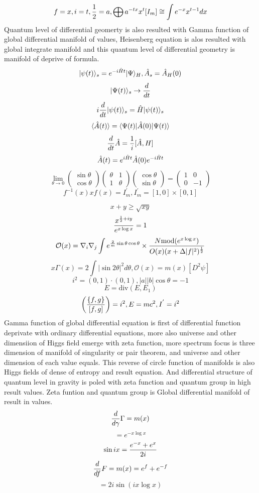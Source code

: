 \documentclass{jsarticle}
\begin{document}
    $$ f = x, i = t, {1 \over 2} = a, \bigoplus a^{-t x}x^t [I_m]
     \cong \int e^{-x} x^{t - 1}dx $$
     Quantum level of differential geomerty is also resulted with
    Gamma function of global differential manifold of values, Heisenberg
    equation is alos resulted with global integrate manifold and this
    quantum level of differential geometry is manifold of deprive of formula.
    $$ |\psi(t)\rangle_s = e^{-i\Hat{H} t}|\Psi\rangle_{H},
    \Hat{A}_s = \Hat{A}_H(0) $$
    $$ |\Psi(t)\rangle_s \to {d \over dt} $$
    $$ i {d \over dt}|\psi (t) \rangle_s = \Hat{H}|\psi(t)\rangle_s $$
    $$ \langle\Hat{A}(t)\rangle = \langle\Psi(t)|\Hat{A}(0)|\Psi(t)\rangle  $$
    $$ {d \over dt}\Hat{A} = {1 \over i}[\Hat{A},H] $$
    $$ \Hat{A}(t) = e^{i\Hat{H}t}\Hat{A}(0)e^{-i\Hat{H}t} $$
    $$ \lim_{\theta \to 0} \begin{pmatrix} \sin \theta \\
    \cos \theta \end{pmatrix} \begin{pmatrix} \theta & 1 \\
    1 & \theta \end{pmatrix} \begin{pmatrix} \cos \theta \\
    \sin \theta \end{pmatrix} = \begin{pmatrix} 1 & 0 \\
    0 & - 1 \end{pmatrix} $$
    $$ f^{-1}(x) x f(x) = I^{'}_m, I^{'}_m = [1,0] \times [0,1] $$

    $$ {x + y} \ge \sqrt{x y} $$
    $$ {x^{{1 \over 2} + iy} \over e^{x \log x}} = 1 $$
    $$ \mathcal{O}(x) = \nabla_i \nabla_j \int e^{{2 \over m}\sin \theta 
    \cos \theta } \times {{N \mathrm{mod}(e^{x \log x})} \over {O(x)(x +
    \Delta |f|^2)^{1 \over 2}}} $$
    $$ x \Gamma(x) = 2 \int|\sin 2 \theta|^2 d \theta, \mathcal{O}(x)
    = m(x)[D^2 \psi] $$
    $$ i^2 = (0,1) \cdot (0,1), |a||b|\cos \theta = - 1 $$
    $$ E = \mathrm{div}(E, E_1) $$
    $$ \left({\{f,g\}} \over [f,g] \right) = i^2, E = mc^2, I^{'} = i^2 $$
     Gamma function of global differential equation is first of differential
    function deprivate with ordinary differential equations, more also
    universe and other dimensiion of Higgs field emerge with zeta function,
    more spectrum focus is three dimension of manifold of singularity or pair
    theorem, and universe and other dimension of each value equals.
    This reverse of circle function of manifolds is also Higgs fields of 
    dense of entropy and result equation. And differential structure of quantum
    level in gravity is poled with zeta function and quantum group in high 
    result values. Zeta funtion and quantum group is Global differential
    manifold of result in values.
    $$ {d \over d \gamma} \Gamma = m(x) $$
    $$ = e^{- x \log x} $$
    $$ \sin i x = {{e^{-x} + e^{x}} \over 2i} $$
    $$ {d \over df}F = m(x) = e^{f} + e^{-f} $$
    $$ = 2 i \sin (i {x \log x}) $$
\end{document}
